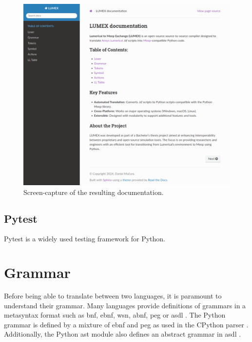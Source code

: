 \begin{figure}[H]

  \label{fig:compiler-stages}
  \centering
  \includegraphics[width=\textwidth]{obrazky-figures/sphinx-lumex.png}
  \caption{Screen-capture of the resulting documentation.}
\end{figure}

\subsection{Pytest}
Pytest is a widely used testing framework for Python. 


\section{Grammar}
Before being able to translate between two languages, it is paramount to understand their grammar. Many languages provide definitions of grammars in a metasyntax format such as \gls{bnf}, \gls{ebnf}, \gls{wsn}, \gls{abnf}, \gls{peg} or \gls{asdl} \cite{asdl}. The Python grammar is defined by a mixture of \gls{ebnf} and \gls{peg} as used in the CPython parser \cite{python3grammar}. Additionally, the Python \gls{ast} module also defines an abstract grammar in \gls{asdl} \cite{python_ast}.

